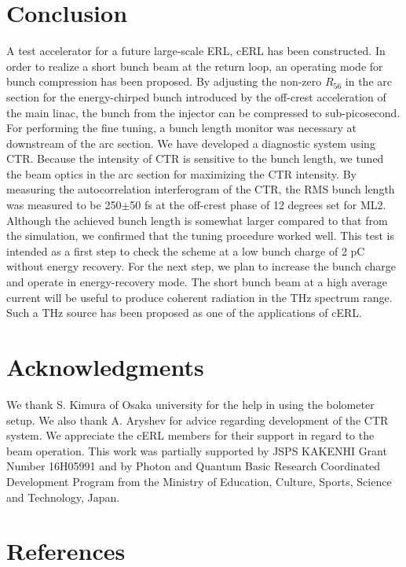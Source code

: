 \documentclass[review]{elsarticle}
\begin{document}
\section{Conclusion}


A test accelerator for a future large-scale ERL,
cERL has been constructed. 
In order to realize a short bunch beam at the return loop,
an operating mode for bunch compression has been proposed.
By adjusting the non-zero $R_{56}$ in the arc section
for the energy-chirped bunch introduced by the off-crest acceleration of the main linac,
the bunch from the injector can be compressed to sub-picosecond. 
For performing the fine tuning,
a bunch length monitor was necessary at downstream of the arc section.
We have developed a diagnostic system using CTR.
Because the intensity of CTR is sensitive to the bunch length,
we tuned the beam optics in the arc section 
for maximizing the CTR intensity.
By measuring the autocorrelation interferogram of the CTR,
the RMS bunch length was measured to be 250$\pm$50 fs
at the off-crest phase of 12 degrees set for ML2.
Although the achieved bunch length is somewhat larger
compared to that from the simulation,
we confirmed that the tuning procedure worked well.
This test is intended as a first step 
to check the scheme at a low bunch charge of 2 pC without energy recovery.
For the next step,
we plan to increase the bunch charge 
and operate in energy-recovery mode.
The short bunch beam at a high average current
will be useful to produce coherent radiation in the THz spectrum range.
Such a THz source has been proposed as one of the applications of cERL.

\section*{Acknowledgments}
We thank S. Kimura of Osaka university for the help in using the bolometer setup.
We also thank A. Aryshev for advice regarding development of the CTR system.
We appreciate the cERL members for their support
in regard to the beam operation. 
This work was partially supported 
by JSPS KAKENHI Grant Number 16H05991
and
by Photon and Quantum Basic Research Coordinated Development Program 
from the Ministry of Education, Culture, Sports, Science and Technology, Japan.


\section*{References}


\end{document}

